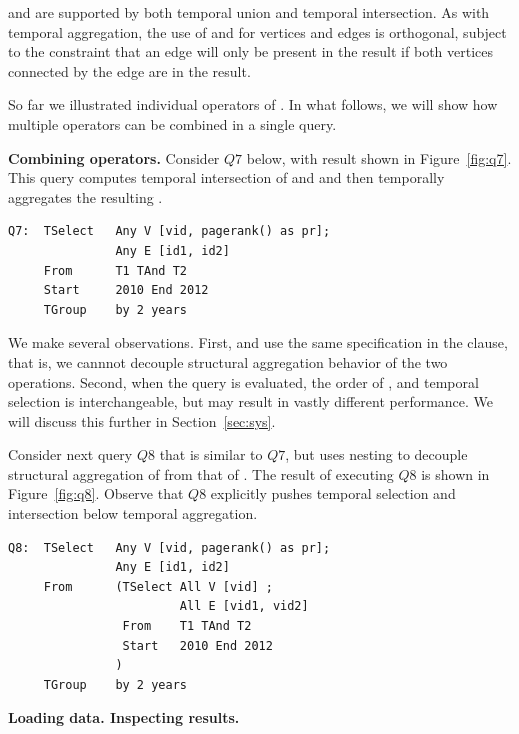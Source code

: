  and  are supported by both temporal union and
temporal intersection.  As with temporal aggregation, the use of
 and  for vertices and edges is orthogonal,
subject to the constraint that an edge will only be present in the
result if both vertices connected by the edge are in the result.

So far we illustrated individual operators of \ql.  In what follows,
we will show how multiple operators can be combined in a single query.

{\bf Combining operators.}  Consider $Q7$ below, with result shown in
Figure~\ref{fig:q7}. This query computes temporal intersection of
 and  and then temporally aggregates the resulting
\tg.

\begin{verbatim}
Q7:  TSelect   Any V [vid, pagerank() as pr]; 
               Any E [id1, id2]
     From      T1 TAnd T2
     Start     2010 End 2012
     TGroup    by 2 years
\end{verbatim}

We make several observations.  First,  and 
use the same specification in the  clause, that is, we
cannnot decouple structural aggregation behavior of the two
operations. Second, when the query is evaluated, the order of
,  and temporal selection is
interchangeable, but may result in vastly different performance.  We
will discuss this further in Section~\ref{sec:sys}.


Consider next query $Q8$ that is similar to $Q7$, but uses nesting to
decouple structural aggregation of  from that of
. The result of executing $Q8$ is shown in
Figure~\ref{fig:q8}.  Observe that $Q8$ explicitly pushes temporal
selection and intersection below temporal aggregation.

\begin{verbatim}
Q8:  TSelect   Any V [vid, pagerank() as pr]; 
               Any E [id1, id2]
     From      (TSelect All V [vid] ; 
                        All E [vid1, vid2]
                From    T1 TAnd T2
                Start   2010 End 2012
               )
     TGroup    by 2 years
\end{verbatim}

{\bf Loading data.  Inspecting results.}

